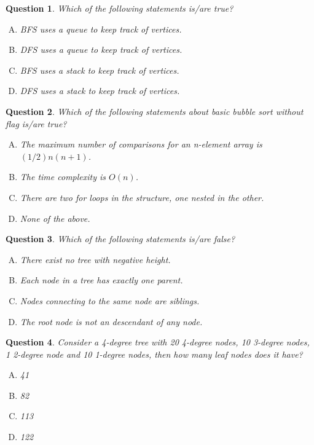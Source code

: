 \documentclass[10.5pt]{article}
\newtheorem{Q}{Question}
\begin{document}
	\begin{Q}
		Which of the following statements is/are true?
		\begin{enumerate}[(A)]
			\item BFS uses a queue to keep track of vertices.
			\item DFS uses a queue to keep track of vertices.
			\item BFS uses a stack to keep track of vertices.
			\item DFS uses a stack to keep track of vertices.
		\end{enumerate}
	\end{Q}
	
	\begin{Q}
		Which of the following statements about basic bubble sort without flag is/are true?
		\begin{enumerate}[(A)]
			\item The maximum number of comparisons for an n-element array is $(1/2)n(n+1)$.
			\item The time complexity is $O(n)$.
			\item There are two for loops in the structure, one nested in the other.
			\item None of the above.
		\end{enumerate}
	\end{Q}
	
	\begin{Q}
		Which of the following statements is/are false?
		\begin{enumerate}[(A)]
			\item There exist no tree with negative height.
			\item Each node in a tree has exactly one parent.
			\item Nodes connecting to the same node are siblings.
			\item The root node is not an descendant of any node.
		\end{enumerate}
	\end{Q}
	
	\begin{Q}
		Consider a 4-degree tree with 20 4-degree nodes, 10 3-degree nodes, 1 2-degree node and 10 1-degree nodes, then how many leaf nodes does it have?
		\begin{enumerate}[(A)]
			\item 41
			\item 82
			\item 113
			\item 122
		\end{enumerate}
	\end{Q}
	
\end{document}
